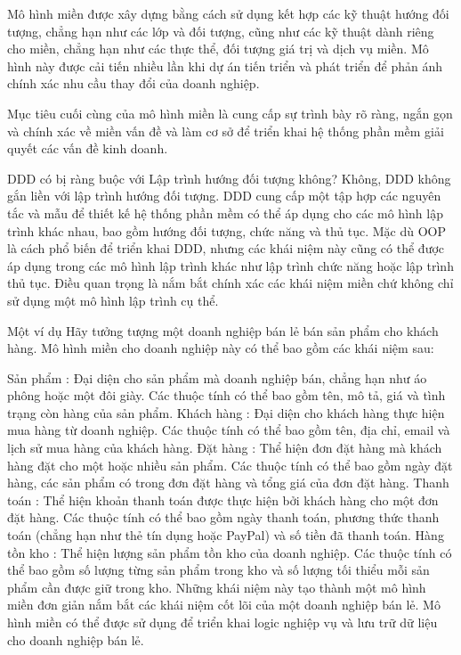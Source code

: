 Mô hình miền được xây dựng bằng cách sử dụng kết hợp các kỹ thuật hướng đối tượng, chẳng hạn như các lớp và đối tượng, cũng như các kỹ thuật dành riêng cho miền, chẳng hạn như các thực thể, đối tượng giá trị và dịch vụ miền. Mô hình này được cải tiến nhiều lần khi dự án tiến triển và phát triển để phản ánh chính xác nhu cầu thay đổi của doanh nghiệp.

Mục tiêu cuối cùng của mô hình miền là cung cấp sự trình bày rõ ràng, ngắn gọn và chính xác về miền vấn đề và làm cơ sở để triển khai hệ thống phần mềm giải quyết các vấn đề kinh doanh.

DDD có bị ràng buộc với Lập trình hướng đối tượng không?
Không, DDD không gắn liền với lập trình hướng đối tượng. DDD cung cấp một tập hợp các nguyên tắc và mẫu để thiết kế hệ thống phần mềm có thể áp dụng cho các mô hình lập trình khác nhau, bao gồm hướng đối tượng, chức năng và thủ tục. Mặc dù OOP là cách phổ biến để triển khai DDD, nhưng các khái niệm này cũng có thể được áp dụng trong các mô hình lập trình khác như lập trình chức năng hoặc lập trình thủ tục. Điều quan trọng là nắm bắt chính xác các khái niệm miền chứ không chỉ sử dụng một mô hình lập trình cụ thể.

Một ví dụ
Hãy tưởng tượng một doanh nghiệp bán lẻ bán sản phẩm cho khách hàng. Mô hình miền cho doanh nghiệp này có thể bao gồm các khái niệm sau:

Sản phẩm : Đại diện cho sản phẩm mà doanh nghiệp bán, chẳng hạn như áo phông hoặc một đôi giày. Các thuộc tính có thể bao gồm tên, mô tả, giá và tình trạng còn hàng của sản phẩm.
Khách hàng : Đại diện cho khách hàng thực hiện mua hàng từ doanh nghiệp. Các thuộc tính có thể bao gồm tên, địa chỉ, email và lịch sử mua hàng của khách hàng.
Đặt hàng : Thể hiện đơn đặt hàng mà khách hàng đặt cho một hoặc nhiều sản phẩm. Các thuộc tính có thể bao gồm ngày đặt hàng, các sản phẩm có trong đơn đặt hàng và tổng giá của đơn đặt hàng.
Thanh toán : Thể hiện khoản thanh toán được thực hiện bởi khách hàng cho một đơn đặt hàng. Các thuộc tính có thể bao gồm ngày thanh toán, phương thức thanh toán (chẳng hạn như thẻ tín dụng hoặc PayPal) và số tiền đã thanh toán.
Hàng tồn kho : Thể hiện lượng sản phẩm tồn kho của doanh nghiệp. Các thuộc tính có thể bao gồm số lượng từng sản phẩm trong kho và số lượng tối thiểu mỗi sản phẩm cần được giữ trong kho.
Những khái niệm này tạo thành một mô hình miền đơn giản nắm bắt các khái niệm cốt lõi của một doanh nghiệp bán lẻ. Mô hình miền có thể được sử dụng để triển khai logic nghiệp vụ và lưu trữ dữ liệu cho doanh nghiệp bán lẻ.


